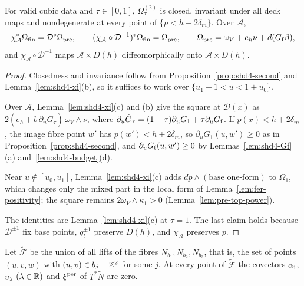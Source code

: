 \begin{proposition}\label{prop:shd4-third}
For valid cubic data and $\tau\in[0,1]$, $\Omega^{(2)}_\tau$ is closed, invariant under all deck maps and nondegenerate at every
point of $\{p<h+2\delta_m\}$. Over $\mathcal A$,
\[
 \chi_{\mathcal A}^*\Omega_{\rm fin}=\mathcal D^*\Omega_{\rm pre},\qquad
 (\chi_{\mathcal A}\circ\mathcal D^{-1})^*\Omega_{\rm fin}=\Omega_{\rm pre},\qquad
 \Omega_{\rm pre}=\omega_V+e_h\nu+d(G_{\rm f}\beta),
\]
and $\chi_{\mathcal A}\circ\mathcal D^{-1}$ maps $\mathcal A\times D(h)$ diffeomorphically onto $\mathcal A\times D(h)$.
\end{proposition}

\begin{proof}
Closedness and invariance follow from Proposition~\ref{prop:shd4-second} and Lemma~\ref{lem:shd4-xi}(b), so it suffices to work over $\{u_1-1<u<1+u_0\}$.

Over $\mathcal A$, Lemma~\ref{lem:shd4-xi}(c) and (b) give the square at $\mathcal D(x)$ as $2(e_h+b\,\partial_u\hat G_\tau)\,\omega_V\wedge\nu$, where $\partial_u\hat G_\tau=(1-\tau)\partial_uG_1+\tau\partial_uG_{\rm f}$. If $p(x)<h+2\delta_m$, the image fibre point $w'$ has $p(w')<h+2\delta_m$, so $\partial_uG_1(u,w')\ge0$ as in Proposition~\ref{prop:shd4-second}, and $\partial_uG_{\rm f}(u,w')\ge0$ by Lemmas~\ref{lem:shd4-Gf}(a) and~\ref{lem:shd4-budget}(d).

Near $u\notin[u_0,u_1]$, Lemma~\ref{lem:shd4-xi}(c) adds $dp\wedge(\text{base one-form})$ to $\Omega_1$, which changes only the mixed part in the local form of Lemma~\ref{lem:fer-positivity}; the square remains $2\omega_V\wedge\kappa_1>0$ (Lemma~\ref{lem:pre-top-power}).

The identities are Lemma~\ref{lem:shd4-xi}(c) at $\tau=1$. The last claim holds because $\mathcal D^{\pm1}$ fix base points, $q_t^{\pm1}$ preserve $D(h)$, and $\chi_{\mathcal A}$ preserves $p$.
\end{proof}

\begin{lemma}\label{lem:shd4-fibres}
Let $\widetilde{\mathcal F}$ be the union of all lifts of the fibres $N_{b_1},N_{b_2},N_{b_3}$, that is, the set of points
$(u,v,w)$ with $(u,v)\in b_j+\mathbb{Z}^2$ for some $j$. At every point of $\widetilde{\mathcal F}$ the covectors $\alpha_1$, $\dot\upsilon_\lambda$ $(\lambda\in\mathbb{R})$ and $\xi^{\rm per}$ of
$T^*\widetilde N$ are zero.
\end{lemma}

